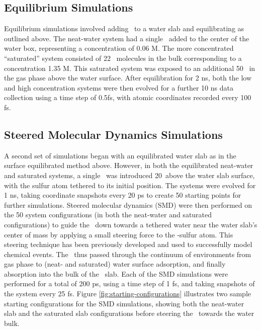 \subsection{Equilibrium Simulations}

Equilibrium simulations involved adding \suldiox~to a water slab and equilibrating as outlined above. The neat-water system had a single \suldiox~added to the center of the water box, representing a concentration of 0.06 M. The more concentrated ``saturated'' system consisted of 22 \suldiox~molecules in the bulk corresponding to a concentration 1.35 M. This saturated system was exposed to an additional 50 \suldiox~in the gas phase above the water surface. After equilibration for 2 ns, both the low and high concentration systems were then evolved for a further 10 ns data collection using a time step of 0.5fs, with atomic coordinates recorded every 100 fs.

\subsection{Steered Molecular Dynamics Simulations}

A second set of simulations began with an equilibrated water slab as in the surface equilibrated method above. However, in both the equilibrated neat-water and saturated systems, a single \suldiox~was introduced 20\angs~above the water slab surface, with the sulfur atom tethered to its initial position. The systems were evolved for 1 ns, taking coordinate snapshots every 20 ps to create 50 starting points for further simulations. Steered molecular dynamics (SMD) were then performed on the 50 system configurations (in both the neat-water and saturated configurations) to guide the \suldiox~down towards a tethered water near the water slab's center of mass by applying a small steering force to the \suldiox-sulfur atom. This steering technique has been previously developed and used to successfully model chemical events.\cite{Isralewitz2001} The \suldiox~thus passed through the continuum of environments from gas phase to (neat- and saturated) water surface adsorption, and finally absorption into the bulk of the \wat~slab. Each of the SMD simulations were performed for a total of 200 ps, using a time step of 1 fs, and taking snapshots of the system every 25 fs. Figure \ref{fig:starting-configurations} illustrates two sample starting configurations for the SMD simulations, showing both the neat-water slab and the saturated slab configurations before steering the \suldiox~towards the water bulk.

